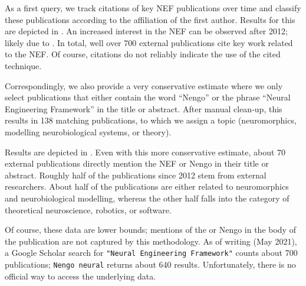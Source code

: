 As a first query, we track citations of key NEF publications \citep[specifically][]{eliasmith2003neural,eliasmith2013how,bekolay2014nengo} over time and classify these publications according to the affiliation of the first author.
Results for this are depicted in .
An increased interest in the NEF can be observed after 2012; likely due to \citet{eliasmith2012largescale}.
In total, well over 700 external publications cite key work related to the NEF.
Of course, citations do not reliably indicate the use of the cited technique.%

Correspondingly, we also provide a very conservative estimate where we only select publications that either contain the word \enquote{Nengo} or the phrase \enquote{Neural Engineering Framework} in the title or abstract.
After manual clean-up, this results in 138 matching publications, to which we assign a topic (neuromorphics, modelling neurobiological systems, or theory).

Results are depicted in  .
Even with this more conservative estimate, about 70 external publications directly mention the NEF or Nengo in their title or abstract. Roughly half of the publications since 2012 stem from external researchers.
About half of the publications are either related to neuromorphics and neurobiological modelling, whereas the other half falls into the category of theoretical neuroscience, robotics, or software.

Of course, these data are lower bounds; mentions of the \NEF or Nengo in the body of the publication are not captured by this methodology.
As of writing (May 2021), a Google Scholar search for \texttt{"Neural Engineering Framework"} counts about 700 publications; \texttt{Nengo neural} returns about 640 results.
Unfortunately, there is no official way to access the underlying data.%
